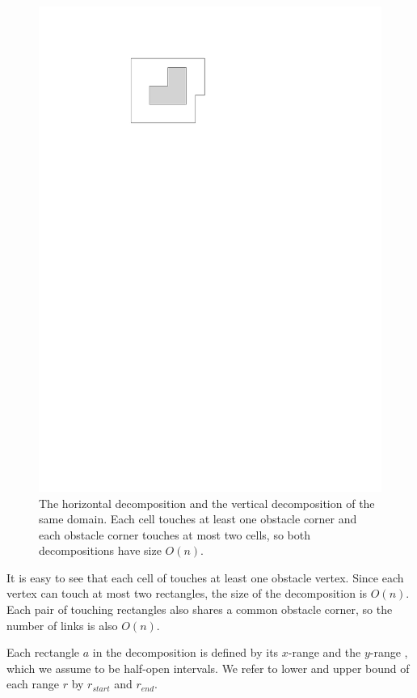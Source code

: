 \documentclass[english,gradu]{tktltiki2018}
\begin{document}
\begin{figure}
	\includegraphics[scale=0.6,page=3]{fig/decomp}
	\caption{The horizontal decomposition and the vertical decomposition of the same domain.
	Each cell touches at least one obstacle corner and each obstacle corner touches at most two cells, so both decompositions have size $O(n)$.}\label{fig:decomp}
\end{figure}

It is easy to see that each cell of  touches at least one obstacle vertex.
Since each vertex can touch at most two rectangles, the size of the decomposition is $O(n)$.
Each pair of touching rectangles also shares a common obstacle corner, so the number of links is also $O(n)$.

Each rectangle $a$ in the decomposition is defined by its $x$-range  and the $y$-range , which we assume to be half-open intervals.
We refer to lower and upper bound of each range $r$ by $r_{start}$ and $r_{end}$.
\end{document}
